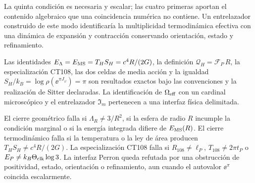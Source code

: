 La quinta condici\'on es necesaria y escalar; las cuatro primeras aportan el
contenido algebraico que una coincidencia num\'erica no contiene. Un
entrelazador construido de este modo identificar\'ia la multiplicidad
termodin\'amica efectiva con una din\'amica de expansi\'on y contracci\'on
conservando orientaci\'on, estado y refinamiento.

\begin{proofstatusbox}
Las identidades
\(E_\Lambda=E_{\rm MS}=T_HS_H=c^4R/(2G)\), la definici\'on
\(\mathcal Q_H=\mathscr F_P\,R\), la especializaci\'on CT108, las dos celdas
de media acci\'on y la igualdad
\(S_H/k_B=\log\rho(\ee^{\pi J_\varphi})=\pi\) son resultados exactos bajo
las convenciones y la realizaci\'on de Sitter declaradas. La identificaci\'on
de \(\Omega_{\rm eff}\) con un cardinal microsc\'opico y el entrelazador
\(\mathfrak I_m\) pertenecen a una interfaz f\'isica delimitada.
\end{proofstatusbox}

\enlargethispage{4\baselineskip}
\begin{falsifierbox}
El cierre geom\'etrico falla si \(\Lambda_R\ne3/R^2\), si la esfera de
radio \(R\) incumple la condici\'on marginal o si la energ\'ia integrada difiere de
\(E_{\rm MS}(R)\). El cierre termodin\'amico falla si la temperatura o la
ley de \'area producen \(T_HS_H\ne c^4R/(2G)\). La especializaci\'on CT108
falla si \(R_{108}\ne\ell_P\), \(T_{108}\ne2\pi t_P\) o
\(E_P\ne k_B\Theta_{\rm clk}\log3\). La interfaz Perron queda refutada por
una obstrucci\'on de positividad, estado, orientaci\'on o refinamiento, aun
cuando el autovalor \(\ee^\pi\) coincida escalarmente.
\end{falsifierbox}
